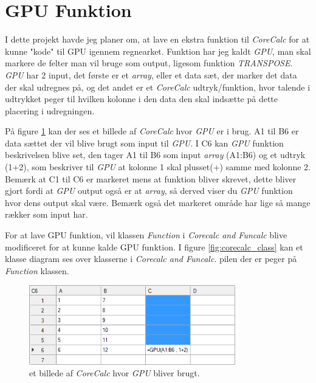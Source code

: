 \section{GPU Funktion}
\label{GPU_F}
I dette projekt havde jeg planer om, at lave en ekstra funktion til \textit{CoreCalc} for at kunne "kode" til GPU igennem regnearket. Funktion har jeg kaldt \emph{GPU}, man skal markere de felter man vil bruge som output, ligesom funktion \textit{TRANSPOSE}. \emph{GPU} har 2 input, det første er et \textit{array}, eller et data sæt, der marker det data der skal udregnes på, og det andet er et \textit{CoreCalc} udtryk/funktion, hvor talende i udtrykket peger til hvilken kolonne i den data den skal indsætte på dette placering i udregningen.

På figure \ref{fig:corecalc1} kan der ses et billede af \textit{CoreCalc} hvor \textit{GPU} er i brug. A1 til B6 er data sættet der vil blive brugt som input til \textit{GPU}. I C6 kan \textit{GPU} funktion beskrivelsen blive set, den tager A1 til B6 som input \textit{array} (A1:B6) og et udtryk (1+2), som beskriver til \textit{GPU} at kolonne 1 skal plusset(+) samme med kolonne 2. Bemærk at C1 til C6 er markeret mens at funktion bliver skrevet, dette bliver gjort fordi at \textit{GPU} output også er at \textit{array}, så derved viser du \textit{GPU} funktion hvor dens output skal være. Bemærk også det markeret område har lige så mange rækker som input har.

For at lave GPU funktion, vil klassen \textit{Function} i \textit{Corecalc and Funcalc} blive modificeret for at kunne kalde GPU funktion. I figure \ref{fig:corecalc_class} kan et klasse diagram ses over klasserne i \textit{Corecalc and Funcalc}. pilen der er peger på \textit{Function} klassen.

\begin{figure}[p]
    \centering
    \includegraphics[width=0.8\textwidth]{Content/Graphic/corecalc1.png}
    \caption{et billede af \textit{CoreCalc} hvor \textit{GPU} bliver brugt.}
    \label{fig:corecalc1}
\end{figure}

